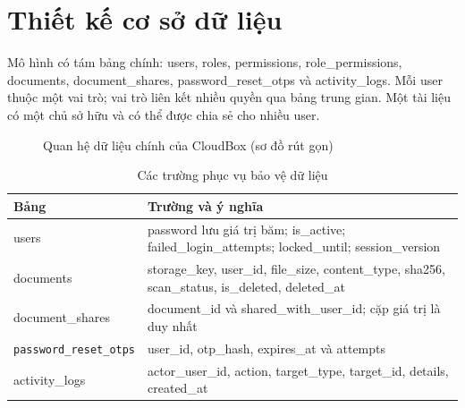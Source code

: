 \section{Thiết kế cơ sở dữ liệu}
Mô hình có tám bảng chính: users, roles, permissions, role\_permissions, documents, document\_shares, password\_reset\_otps và activity\_logs. Mỗi user thuộc một vai trò; vai trò liên kết nhiều quyền qua bảng trung gian. Một tài liệu có một chủ sở hữu và có thể được chia sẻ cho nhiều user.
\begin{figure}[htbp]\centering
{}
\caption{Quan hệ dữ liệu chính của CloudBox (sơ đồ rút gọn)}
\end{figure}
\begin{table}[htbp]\centering\small
\caption{Các trường phục vụ bảo vệ dữ liệu}
\begin{tabularx}{\textwidth}{P{3.1cm}X}\toprule
\textbf{Bảng}&\textbf{Trường và ý nghĩa}\\\midrule
users & password lưu giá trị băm; is\_active; failed\_login\_attempts; locked\_until; session\_version\\
documents & storage\_key, user\_id, file\_size, content\_type, sha256, scan\_status, is\_deleted, deleted\_at\\
document\_shares & document\_id và shared\_with\_user\_id; cặp giá trị là duy nhất\\
\nolinkurl{password_reset_otps} & user\_id, otp\_hash, expires\_at và attempts\\
activity\_logs & actor\_user\_id, action, target\_type, target\_id, details, created\_at\\\bottomrule
\end{tabularx}\end{table}
